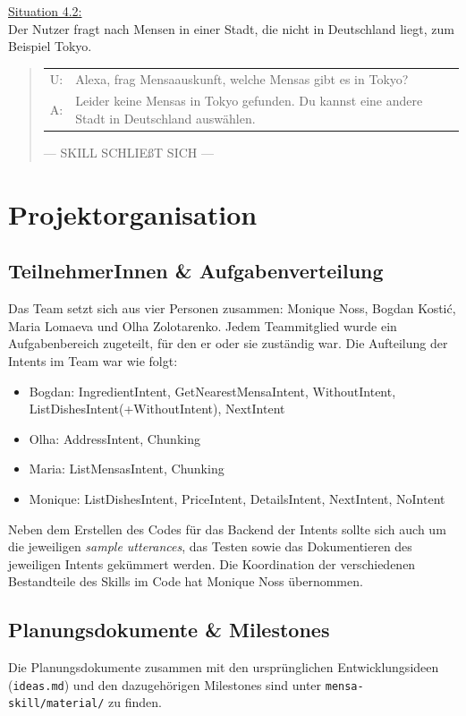 \documentclass[12pt]{article}
\begin{document}
\ul{Situation 4.2:}\\Der Nutzer fragt nach Mensen in einer Stadt, die nicht in Deutschland liegt, zum Beispiel Tokyo.
\begin{quote}
\begin{tabular}{lp{12cm}}
	U:& Alexa, frag Mensaauskunft, welche Mensas gibt es in Tokyo?\\
	A:& Leider keine Mensas in Tokyo gefunden. Du kannst eine andere Stadt in Deutschland auswählen.\\[0.2cm]
\end{tabular}
--- SKILL SCHLIEßT SICH ---\\
\end{quote}

\section{Projektorganisation}
\subsection{TeilnehmerInnen \& Aufgabenverteilung}
Das Team setzt sich aus vier Personen zusammen: Monique Noss, Bogdan Kostić, Maria Lomaeva und Olha Zolotarenko. 
Jedem Teammitglied wurde ein Aufgabenbereich zugeteilt, für den er oder sie zuständig war.
Die Aufteilung der Intents im Team war wie folgt:
\begin{itemize}
	\setlength\itemsep{0em}
	\item Bogdan: IngredientIntent, GetNearestMensaIntent, WithoutIntent, ListDishesIntent(+WithoutIntent), NextIntent
	\item Olha: AddressIntent, Chunking
	\item Maria: ListMensasIntent, Chunking
	\item Monique: ListDishesIntent, PriceIntent, DetailsIntent, NextIntent, NoIntent
\end{itemize}

Neben dem Erstellen des Codes für das Backend der Intents sollte sich auch um die jeweiligen \emph{sample utterances}, das Testen sowie das Dokumentieren des jeweiligen Intents gekümmert werden.
Die Koordination der verschiedenen Bestandteile des Skills im Code hat Monique Noss übernommen.

\subsection{Planungsdokumente \& Milestones}
Die Planungsdokumente zusammen mit den ursprünglichen Entwicklungsideen (\texttt{ideas.md}) und den dazugehörigen Milestones sind unter \texttt{mensa-skill/material/} zu finden. 
\end{document}
